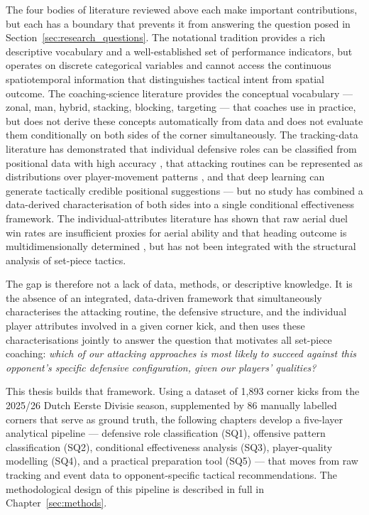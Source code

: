The four bodies of literature reviewed above each make important contributions,
but each has a boundary that prevents it from answering the question posed in
Section~\ref{sec:research_questions}. The notational tradition provides a rich
descriptive vocabulary and a well-established set of performance indicators, but
operates on discrete categorical variables and cannot access the continuous
spatiotemporal information that distinguishes tactical intent from spatial
outcome. The coaching-science literature provides the conceptual vocabulary ---
zonal, man, hybrid, stacking, blocking, targeting --- that coaches use in
practice, but does not derive these concepts automatically from data and does not
evaluate them conditionally on both sides of the corner simultaneously. The
tracking-data literature has demonstrated that individual defensive roles can be
classified from positional data with high accuracy \citep{Bauer2022}, that
attacking routines can be represented as distributions over player-movement
patterns \citep{ShawGopaladesikan2020}, and that deep learning can generate
tactically credible positional suggestions \citep{Wang2024} --- but no study has
combined a data-derived characterisation of both sides into a single conditional
effectiveness framework. The individual-attributes literature has shown that
raw aerial duel win rates are insufficient proxies for aerial ability
\citep{Kim2024} and that heading outcome is multidimensionally determined
\citep{Forte2019}, but has not been integrated with the structural analysis of
set-piece tactics.

The gap is therefore not a lack of data, methods, or descriptive knowledge.
It is the absence of an integrated, data-driven framework that simultaneously
characterises the attacking routine, the defensive structure, and the individual
player attributes involved in a given corner kick, and then uses these
characterisations jointly to answer the question that motivates all set-piece
coaching: \emph{which of our attacking approaches is most likely to succeed
against this opponent's specific defensive configuration, given our players'
qualities?}

This thesis builds that framework. Using a dataset of 1{,}893 corner kicks from
the 2025/26 Dutch Eerste Divisie season, supplemented by 86 manually labelled
corners that serve as ground truth, the following chapters develop a five-layer
analytical pipeline --- defensive role classification (SQ1), offensive pattern
classification (SQ2), conditional effectiveness analysis (SQ3), player-quality
modelling (SQ4), and a practical preparation tool (SQ5) --- that moves from raw
tracking and event data to opponent-specific tactical recommendations. The
methodological design of this pipeline is described in full in
Chapter~\ref{sec:methods}.